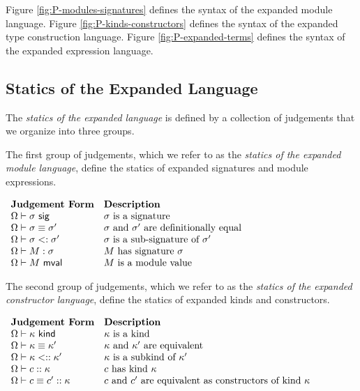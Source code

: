 Figure \ref{fig:P-modules-signatures} defines the syntax of the expanded module language. Figure \ref{fig:P-kinds-constructors} defines the syntax of the expanded type construction language. Figure \ref{fig:P-expanded-terms} defines the syntax of the expanded expression language.


\subsection{Statics of the Expanded Language}
The \emph{statics of the expanded language} is defined by a collection of judgements that we organize into three groups.

The first group of judgements, which we refer to as the \emph{statics of the expanded module language}, define the statics of expanded signatures and module expressions.

\vspace{5px}
$\begin{array}{ll}
\textbf{Judgement Form} & \textbf{Description}\\
\Omega \vdash \sigma~\mathsf{sig} & \text{$\sigma$ is a signature }\\
\Omega \vdash \sigma \equiv \sigma' & \text{$\sigma$ and $\sigma'$ are definitionally equal}\\
\Omega \vdash \sigma <: \sigma' & \text{$\sigma$ is a sub-signature of $\sigma'$}\\
\Omega \vdash M : \sigma & \text{$M$ has signature $\sigma$}\\
\Omega \vdash M~\mathsf{mval} & \text{$M$ is a module value}
\end{array}$
\vspace{5px}

The second group of judgements, which we refer to as the \emph{statics of the expanded constructor language}, define the statics of expanded kinds and constructors.

\vspace{5px}
$\begin{array}{ll}
\textbf{Judgement Form} & \textbf{Description}\\
\Omega \vdash \kappa~\mathsf{kind} & \text{$\kappa$ is a kind}\\
\Omega \vdash \kappa \equiv \kappa' & \text{$\kappa$ and $\kappa'$ are equivalent}\\
\Omega \vdash \kappa <:: \kappa' & \text{$\kappa$ is a subkind of $\kappa'$}\\
\Omega \vdash c :: \kappa & \text{$c$ has kind $\kappa$}\\
\Omega \vdash c \equiv c' :: \kappa & \text{$c$ and $c'$ are equivalent as constructors of kind $\kappa$}
\end{array}$
\vspace{5px}

